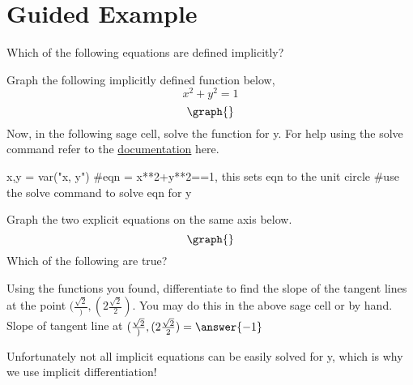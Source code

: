 \documentclass{ximera}
\begin{document}
\section{Guided Example}
\begin{question}
Which of the following equations are defined implicitly?
\begin{selectAll}
\end{selectAll}
\end{question}
\begin{question}
Graph the following implicitly defined function below, $$x^2+y^2=1$$
\[
\graph{}
\]
Now, in the following sage cell, solve the function for y. For help using the solve command refer to the \href{http://doc.sagemath.org/html/en/tutorial/tour_algebra.html#solving-equations}{documentation} here.
\begin{onlineOnly}
\begin{sageCell}
x,y = var("x, y")
#eqn = x**2+y**2==1, this sets eqn to the unit circle
#use the solve command to solve eqn for y
\end{sageCell}
\end{onlineOnly}
Graph the two explicit equations on the same axis below.
\[
\graph{}
\]
Which of the following are true?
\begin{selectAll}
\end{selectAll}
\end{question}
\begin{question}
Using the functions you found, differentiate to find the slope of the tangent lines at the point $(\frac{\sqrt{2}}),({2}\frac{\sqrt{2}}{2})$. You may do this in the above sage cell or by hand.
Slope of tangent line at $(\frac{\sqrt{2}}),({2}\frac{\sqrt{2}}{2})=\answer{-1}$
\end{question}
Unfortunately not all implicit equations can be easily solved for y, which is why we use implicit differentiation!
\end{document}
